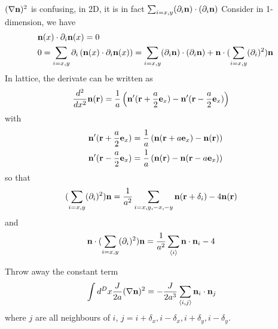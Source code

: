 \documentclass[aps,superscriptaddress,groupedaddress]{revtex4}  %
\begin{document}
$(\nabla  {\bf n})^2$ is confusing, in 2D, it is in fact $\sum _{i=x,y}(\partial _i {\bf n})\cdot (\partial _i {\bf n})$
Consider in 1-dimension, we have
\begin{equation}
\begin{split}
&{\bf n}(x)\cdot \partial _i {\bf n}(x)=0\\
&0=\sum _{i=x,y} \partial _i\left({\bf n}(x)\cdot \partial _i {\bf n}(x)\right)=\sum _{i=x,y}(\partial _i {\bf n})\cdot (\partial _i {\bf n}) + {\bf n}\cdot (\sum _{i=x,y}(\partial _i)^2){\bf n}\\
\end{split}
\end{equation}
In lattice, the derivate can be written as
\begin{equation}
\begin{split}
&\frac{d^2}{dx^2}{\bf n}({\bf r})=\frac{1}{a}\left({\bf n}'({\bf r}+\frac{a}{2}{\bf e}_x)-{\bf n}'({\bf r}-\frac{a}{2}{\bf e}_x)\right)
\end{split}
\end{equation}
with
\begin{equation}
\begin{split}
&{\bf n}'({\bf r}+\frac{a}{2}{\bf e}_x)=\frac{1}{a}\left({\bf n}({\bf r}+a{\bf e}_x)-{\bf n}({\bf r})\right)\\
&{\bf n}'({\bf r}-\frac{a}{2}{\bf e}_x)=\frac{1}{a}\left({\bf n}({\bf r})-{\bf n}({\bf r}-a{\bf e}_x)\right)\\
\end{split}
\end{equation}
so that
\begin{equation}
\begin{split}
&(\sum _{i=x,y}(\partial _i)^2){\bf n}=\frac{1}{a^2}\sum _{i=x,y,-x,-y}{\bf n}({\bf r}+\delta _i)-4{\bf n}({\bf r})
\end{split}
\end{equation}
and
\begin{equation}
\begin{split}
&{\bf n}\cdot (\sum _{i=x,y}(\partial _i)^2){\bf n}=\frac{1}{a^2}\sum _{\langle i\rangle}{\bf n}\cdot {\bf n}_i-4
\end{split}
\end{equation}

Throw away the constant term
\begin{equation}
\begin{split}
&\int d^D x\frac{J}{2a}(\nabla {\bf n})^2=-\frac{J}{2a^3}\sum _{\langle i, j\rangle}{\bf n}_i\cdot {\bf n}_j
\end{split}
\end{equation}
where $j$ are all neighbours of $i$, $j=i+\delta_x,i-\delta_x,i+\delta_y,i-\delta_y$.
\end{document}
